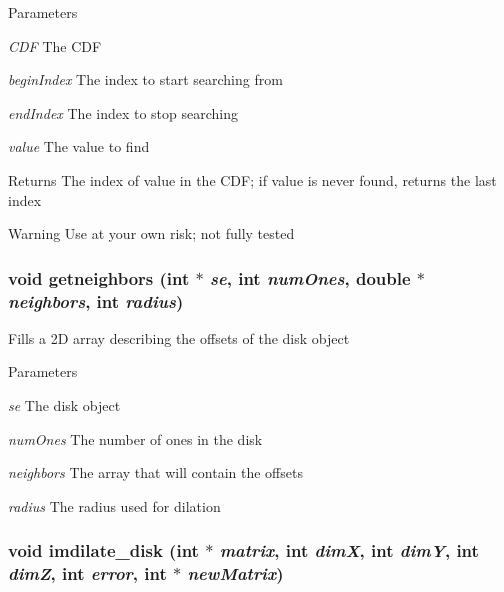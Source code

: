 \begin{DoxyParams}{Parameters}
\item[{\em CDF}]The CDF \item[{\em beginIndex}]The index to start searching from \item[{\em endIndex}]The index to stop searching \item[{\em value}]The value to find \end{DoxyParams}
\begin{DoxyReturn}{Returns}
The index of value in the CDF; if value is never found, returns the last index 
\end{DoxyReturn}
\begin{DoxyWarning}{Warning}
Use at your own risk; not fully tested 
\end{DoxyWarning}
\hypertarget{ex__particle__CUDA__naive_8cu_a2a8357e06057d48a030afcb481081349}{
\subsubsection[{getneighbors}]{\setlength{\rightskip}{0pt plus 5cm}void getneighbors (int $\ast$ {\em se}, \/  int {\em numOnes}, \/  double $\ast$ {\em neighbors}, \/  int {\em radius})}}
\label{ex__particle__CUDA__naive_8cu_a2a8357e06057d48a030afcb481081349}
Fills a 2D array describing the offsets of the disk object 
\begin{DoxyParams}{Parameters}
\item[{\em se}]The disk object \item[{\em numOnes}]The number of ones in the disk \item[{\em neighbors}]The array that will contain the offsets \item[{\em radius}]The radius used for dilation \end{DoxyParams}
\hypertarget{ex__particle__CUDA__naive_8cu_a707e839d9152f9bf820dee64c6627f5b}{
\subsubsection[{imdilate\_\-disk}]{\setlength{\rightskip}{0pt plus 5cm}void imdilate\_\-disk (int $\ast$ {\em matrix}, \/  int {\em dimX}, \/  int {\em dimY}, \/  int {\em dimZ}, \/  int {\em error}, \/  int $\ast$ {\em newMatrix})}}
